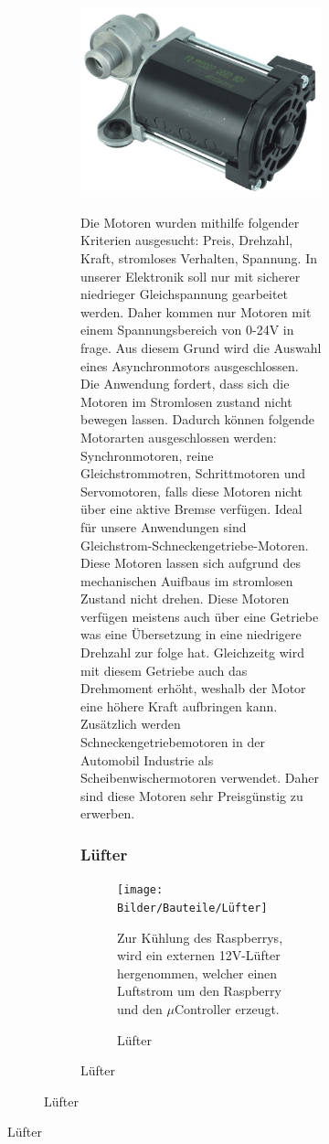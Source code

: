 \begin{figure}[H]
\begin{center}
\begin{figure}[H]
\begin{center}
\begin{figure}[H]
\begin{center}
\includegraphics[width=10cm]{Bilder/Bauteile/Motor}
\caption{Motor}
\label{Motor}
Die Motoren wurden mithilfe folgender Kriterien ausgesucht: Preis, Drehzahl, Kraft, stromloses Verhalten, Spannung.
In unserer Elektronik soll nur mit sicherer niedrieger Gleichspannung gearbeitet werden. Daher kommen nur Motoren mit einem Spannungsbereich von 0-24V in frage. Aus diesem Grund wird die Auswahl eines Asynchronmotors ausgeschlossen. Die Anwendung fordert, dass sich die Motoren im Stromlosen zustand nicht bewegen lassen. Dadurch können folgende Motorarten ausgeschlossen werden: Synchronmotoren, reine Gleichstrommotren, Schrittmotoren und Servomotoren, falls diese Motoren nicht über eine aktive Bremse verfügen. Ideal für unsere Anwendungen sind Gleichstrom-Schneckengetriebe-Motoren. Diese Motoren lassen sich aufgrund des mechanischen Auifbaus im stromlosen Zustand nicht drehen. Diese Motoren verfügen meistens auch über eine Getriebe was eine Übersetzung in eine niedrigere Drehzahl zur folge hat. Gleichzeitg wird mit diesem Getriebe auch das Drehmoment erhöht, weshalb der Motor eine höhere Kraft aufbringen kann. Zusätzlich werden Schneckengetriebemotoren in der Automobil Industrie als Scheibenwischermotoren verwendet. Daher sind diese Motoren sehr Preisgünstig zu erwerben.

\subsubsection{Lüfter}
\begin{figure}[H] 
\begin{center}

\texttt{[image: Bilder/Bauteile/Lüfter]}
\caption{Lüfter}
\label{Lüfter}
Zur Kühlung des Raspberrys, wird ein externen 12V-Lüfter hergenommen, welcher einen Luftstrom um den Raspberry und den $\mu$Controller erzeugt.

\end{center}
\end{figure}
\end{center}
\end{figure}
\end{center}
\end{figure}
\end{center}
\end{figure}
